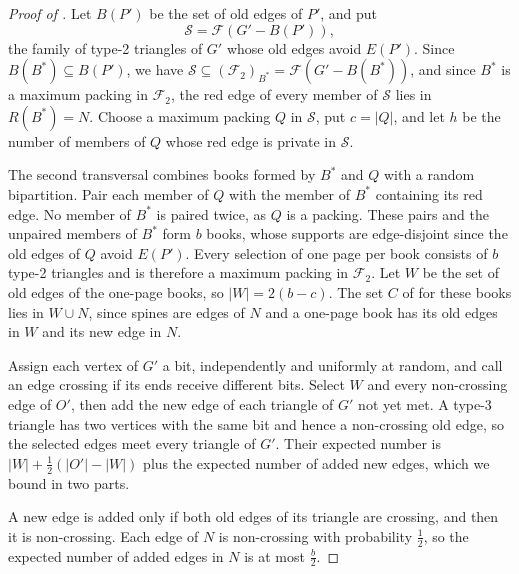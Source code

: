 \documentclass[11pt]{article}
\theoremstyle{remark}
\newcommand{\F}{\mathcal F}
\newcommand{\Sfam}{\mathcal S}
\begin{document}
\begin{proof}[Proof of ]
Let $B(P')$ be the set of old edges of $P'$, and put
\[
 \Sfam=\F(G'-B(P')),
\]
the family of type-2 triangles of $G'$ whose old edges avoid $E(P')$. Since $B(B^*)\subseteq B(P')$, we have $\Sfam\subseteq(\F_2)_{B^*}=\F(G'-B(B^*))$, and since $B^*$ is a maximum packing in $\F_2$, the red edge of every member of $\Sfam$ lies in $R(B^*)=N$. Choose a maximum packing $Q$ in $\Sfam$, put $c=|Q|$, and let $h$ be the number of members of $Q$ whose red edge is private in $\Sfam$.

The second transversal combines books formed by $B^*$ and $Q$ with a random bipartition. Pair each member of $Q$ with the member of $B^*$ containing its red edge. No member of $B^*$ is paired twice, as $Q$ is a packing. These pairs and the unpaired members of $B^*$ form $b$ books, whose supports are edge-disjoint since the old edges of $Q$ avoid $E(P')$. Every selection of one page per book consists of $b$ type-2 triangles and is therefore a maximum packing in $\F_2$. Let $W$ be the set of old edges of the one-page books, so $|W|=2(b-c)$. The set $C$ of  for these books lies in $W\cup N$, since spines are edges of $N$ and a one-page book has its old edges in $W$ and its new edge in $N$.

Assign each vertex of $G'$ a bit, independently and uniformly at random, and call an edge crossing if its ends receive different bits. Select $W$ and every non-crossing edge of $O'$, then add the new edge of each triangle of $G'$ not yet met. A type-3 triangle has two vertices with the same bit and hence a non-crossing old edge, so the selected edges meet every triangle of $G'$. Their expected number is $|W|+\frac12(|O'|-|W|)$ plus the expected number of added new edges, which we bound in two parts.

A new edge is added only if both old edges of its triangle are crossing, and then it is non-crossing. Each edge of $N$ is non-crossing with probability $\frac12$, so the expected number of added edges in $N$ is at most $\frac b2$.


\end{proof}
\end{document}
